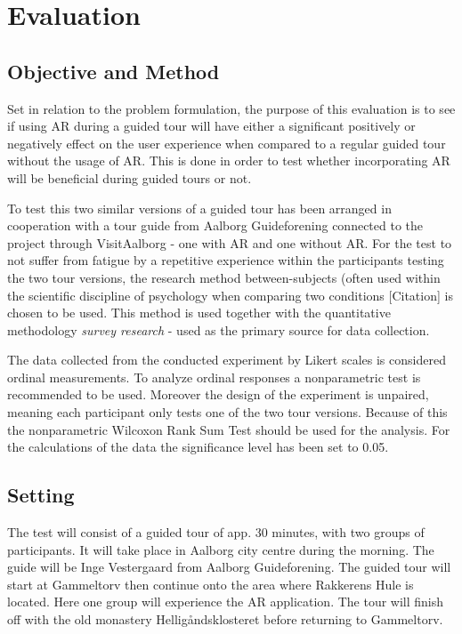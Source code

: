 \chapter{Evaluation}\label{ch:evaluation}
\section{Objective and Method} 
Set in relation to the problem formulation, the purpose of this evaluation is to see if using AR during a guided tour will have either a significant positively or negatively effect on the user experience when compared to a regular guided tour without the usage of AR. This is done in order to test whether incorporating AR will be beneficial during guided tours or not. 

To test this two similar versions of a guided tour has been arranged in cooperation with a tour guide from Aalborg Guideforening connected to the project through VisitAalborg - one with AR and one without AR. For the test to not suffer from fatigue by a repetitive experience within the participants testing the two tour versions, the research method between-subjects (often used within the scientific discipline of psychology when comparing two conditions [Citation]  is chosen to be used. This method is used together with the quantitative methodology \textit{survey research} - used as the primary source for data collection.

The data collected from the conducted experiment by Likert scales is considered ordinal measurements. To analyze ordinal responses a nonparametric test is recommended to be used. Moreover the design of the experiment is unpaired, meaning each participant only tests one of the two tour versions. Because of this the nonparametric Wilcoxon Rank Sum Test should be used for the analysis. For the calculations of the data the significance level has been set to 0.05.


\section{Setting}
The test will consist of a guided tour of app. 30 minutes, with two groups of participants. It will take place in Aalborg city centre during the morning. The guide will be Inge Vestergaard from Aalborg Guideforening. The guided tour will start at Gammeltorv then continue onto the area where Rakkerens Hule is located. Here one group will experience the AR application. The tour will finish off with the old monastery Helligåndsklosteret before returning to Gammeltorv. 

